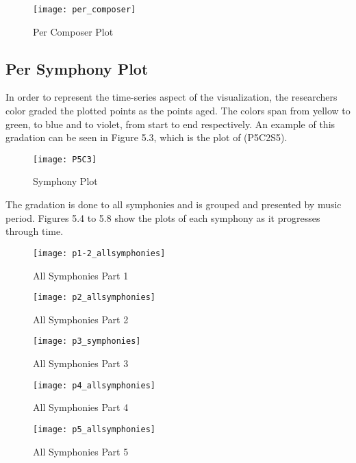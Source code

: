 \begin{figure}[!htb]
\caption{Per Composer Plot}
\centering
\texttt{[image: per\_composer]}
\end{figure}

\subsection{Per Symphony Plot}
In order to represent the time-series aspect of the visualization, the researchers color graded the plotted points as the points aged. The colors span from yellow to green, to blue and to violet, from start to end respectively. An example of this gradation can be seen in Figure 5.3, which is the plot of (P5C2S5).

\begin{figure}[!htb]
\caption{Symphony Plot}
\centering
\texttt{[image: P5C3]}
\end{figure}

The gradation is done to all symphonies and is grouped and presented by music period. Figures 5.4 to 5.8 show the plots of each symphony as it progresses through time. 

\begin{figure}[h]
\caption{All Symphonies Part 1}
\centering
\texttt{[image: p1-2\_allsymphonies]}
\end{figure}

\begin{figure}[h]
\caption{All Symphonies Part 2}
\centering
\texttt{[image: p2\_allsymphonies]}
\end{figure}

\begin{figure}[h]
\caption{All Symphonies Part 3}
\centering
\texttt{[image: p3\_symphonies]}
\end{figure}

\begin{figure}[h]
\caption{All Symphonies Part 4}
\centering
\texttt{[image: p4\_allsymphonies]}
\end{figure}

\begin{figure}[h]
\caption{All Symphonies Part 5}
\centering
\texttt{[image: p5\_allsymphonies]}
\end{figure}